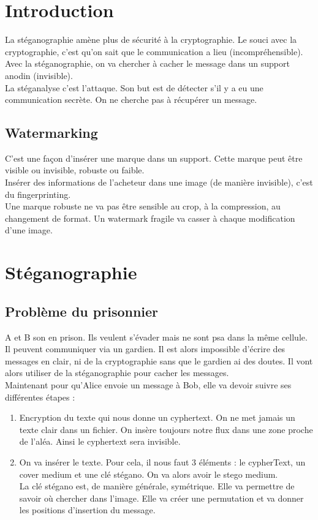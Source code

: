 \section{Introduction}
La stéganographie amène plus de sécurité à la cryptographie. Le souci avec la cryptographie, c'est qu'on sait que le communication a lieu (incompréhensible). Avec la stéganographie, on va chercher à cacher le message dans un support anodin (invisible).\\
La stéganalyse c'est l'attaque. Son but est de détecter s'il y a eu une communication secrète. On ne cherche pas à récupérer un message.
\subsection{Watermarking}
C'est une façon d'insérer une marque dans un support. Cette marque peut être visible ou invisible, robuste ou faible.\\
Insérer des informations de l'acheteur dans une image (de manière invisible), c'est du fingerprinting.\\
Une marque robuste ne va pas être sensible au crop, à la compression, au changement de format. Un watermark fragile va casser à chaque modification d'une image.
\section{Stéganographie}
\subsection{Problème du prisonnier}
A et B son en prison. Ils veulent s'évader mais ne sont psa dans la même cellule. Il peuvent communiquer via un gardien. Il est alors impossible d'écrire des messages en clair, ni de la cryptographie sans que le gardien ai des doutes. Il vont alors utiliser de la stéganographie pour cacher les messages.\\
Maintenant pour qu'Alice envoie un message à Bob, elle va devoir suivre ses différentes étapes :
\begin{enumerate}
 \item Encryption du texte qui nous donne un cyphertext. On ne met jamais un texte clair dans un fichier. On insère toujours notre flux dans une zone proche de l'aléa. Ainsi le cyphertext sera invisible.
 \item On va insérer le texte. Pour cela, il nous faut 3 éléments : le cypherText, un cover medium et une clé stégano. On va alors avoir le stego medium.\\La clé stégano est, de manière générale, symétrique. Elle va permettre de savoir où chercher dans l'image. Elle va créer une permutation et va donner les positions d'insertion du message.
\end{enumerate}
